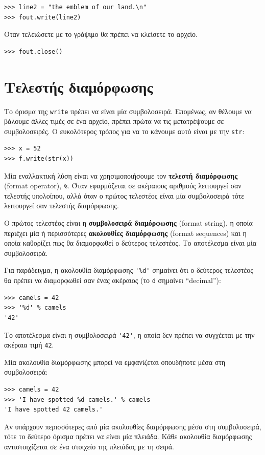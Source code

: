 \documentclass[10pt]{book}
\begin{document}
\begin{verbatim}
>>> line2 = "the emblem of our land.\n"
>>> fout.write(line2)
\end{verbatim}
%
Όταν τελειώσετε με το γράψιμο θα πρέπει να κλείσετε το αρχείο.  

\begin{verbatim}
>>> fout.close()
\end{verbatim}
%


 
\section{Τελεστής διαμόρφωσης}

Το όρισμα της {\tt write} πρέπει να είναι μία συμβολοσειρά. Επομένως, αν θέλουμε να βάλουμε άλλες 
τιμές σε ένα αρχείο, πρέπει πρώτα να τις μετατρέψουμε σε συμβολοσειρές. Ο ευκολότερος τρόπος για να το κάνουμε αυτό είναι με την {\tt str}: 

\begin{verbatim}
>>> x = 52
>>> f.write(str(x))
\end{verbatim}
%
Μία εναλλακτική λύση είναι να χρησιμοποιήσουμε τον {\bf τελεστή διαμόρφωσης} (format operator), {\tt \%}. Όταν εφαρμόζεται σε ακέραιους αριθμούς λειτουργεί σαν τελεστής υπολοίπου, αλλά όταν ο πρώτος τελεστέος είναι μία συμβολοσειρά τότε λειτουργεί σαν τελεστής διαμόρφωσης.

Ο πρώτος τελεστέος είναι η {\bf συμβολοσειρά διαμόρφωσης} (format string), η οποία περιέχει μία ή περισσότερες {\bf ακολουθίες διαμόρφωσης} (format sequences) και η οποία καθορίζει πως θα διαμορφωθεί ο δεύτερος τελεστέος. Το αποτέλεσμα είναι μία συμβολοσειρά.

Για παράδειγμα, η ακολουθία διαμόρφωσης \verb"'%d'" σημαίνει ότι ο δεύτερος τελεστέος θα πρέπει να διαμορφωθεί σαν ένας ακέραιος (το {\tt d} σημαίνει ``decimal''):

\begin{verbatim}
>>> camels = 42
>>> '%d' % camels
'42'
\end{verbatim}
%
Το αποτέλεσμα είναι η συμβολοσειρά \verb"'42'", η οποία δεν πρέπει να συγχέεται με την ακέραια τιμή {\tt 42}.

Μία ακολουθία διαμόρφωσης μπορεί να εμφανίζεται οπουδήποτε μέσα στη συμβολοσειρά:

\begin{verbatim}
>>> camels = 42
>>> 'I have spotted %d camels.' % camels
'I have spotted 42 camels.'
\end{verbatim}
%
Αν υπάρχουν περισσότερες από μία ακολουθίες διαμόρφωσης μέσα στη συμβολοσειρά, τότε το δεύτερο όρισμα πρέπει να είναι μία πλειάδα. Κάθε ακολουθία διαμόρφωσης αντιστοιχίζεται σε ένα στοιχείο της πλειάδας με τη σειρά.
\end{document}
